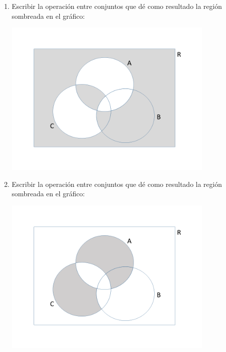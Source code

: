 \documentclass[12pt]{article}
\begin{document}
\begin{enumerate}
\item  
Escribir la operación entre conjuntos que dé como resultado la  región sombreada en el gráfico:
\begin{center} 
\includegraphics[width= 0.8\textwidth]{ej1_1.png} 
\end{center}

\item  
Escribir la operación entre conjuntos que dé como resultado la  región sombreada en el gráfico:
\begin{center} 
\includegraphics[width= 0.8\textwidth]{ej1_2.png} 
\end{center}


\end{enumerate}
\end{document}
